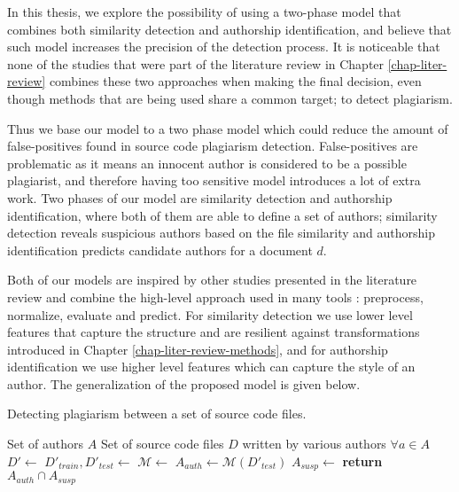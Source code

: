 
In this thesis, we explore the possibility of using a two-phase model that combines both similarity detection and authorship identification, and believe that such model increases the precision of the detection process. It is noticeable that none of the studies that were part of the literature review in Chapter \ref{chap-liter-review} combines these two approaches when making the final decision, even though methods that are being used share a common target; to detect plagiarism. 

Thus we base our model to a two phase model which could reduce the amount of false-positives found in source code plagiarism detection. False-positives are problematic as it means an innocent author is considered to be a possible plagiarist, and therefore having too sensitive model introduces a lot of extra work. Two phases of our model are similarity detection and authorship identification, where both of them are able to define a set of authors; similarity detection reveals suspicious authors based on the file similarity and authorship identification predicts candidate authors for a document $d$. 


Both of our models are inspired by other studies presented in the literature review and combine the high-level approach used in many tools \cite{RSCAD2016}: preprocess, normalize, evaluate and predict. For similarity detection we use lower level features that capture the structure and are resilient against transformations introduced in Chapter \ref{chap-liter-review-methods}, and for authorship identification we use higher level features which can capture the style of an author. The generalization of the proposed model is given below.

\begin{algorithm}[ht]
\caption{Detecting plagiarism between a set of source code files.}
\label{alg-toplvl}
\begin{algorithmic}

\Require Set of authors $A$
\Require Set of source code files $D$ written by various authors $\forall a \in A$
   \State $D'\gets$ 
   \State $D'_{train}, D'_{test} \gets$ 
   \State $\mathcal{M} \gets$ 
   \State $A_{auth} \gets \mathcal{M}(D'_{test})$
   \State $A_{susp} \gets$ 
   \State \textbf{return} $A_{auth} \cap A_{susp}$
\EndProcedure

\end{algorithmic}
\end{algorithm}

